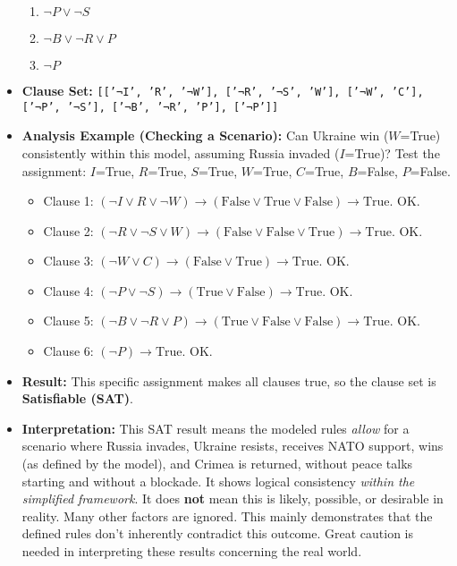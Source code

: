 \documentclass[11pt, a4paper]{article}
\begin{document}
\begin{itemize}
\begin{enumerate}
        \item $\neg P \vee \neg S$
        \item $\neg B \vee \neg R \vee P$
        \item $\neg P$
    \end{enumerate}
    \item \textbf{Clause Set:} \texttt{[['¬I', 'R', '¬W'], ['¬R', '¬S', 'W'], ['¬W', 'C'], ['¬P', '¬S'], ['¬B', '¬R', 'P'], ['¬P']]}
    \item \textbf{Analysis Example (Checking a Scenario):} Can Ukraine win ($W$=True) consistently within this model, assuming Russia invaded ($I$=True)? Test the assignment: $I$=True, $R$=True, $S$=True, $W$=True, $C$=True, $B$=False, $P$=False.
    \begin{itemize}
        \item Clause 1: $(\neg I \vee R \vee \neg W) \rightarrow (\text{False} \vee \text{True} \vee \text{False}) \rightarrow \text{True}$. OK.
        \item Clause 2: $(\neg R \vee \neg S \vee W) \rightarrow (\text{False} \vee \text{False} \vee \text{True}) \rightarrow \text{True}$. OK.
        \item Clause 3: $(\neg W \vee C) \rightarrow (\text{False} \vee \text{True}) \rightarrow \text{True}$. OK.
        \item Clause 4: $(\neg P \vee \neg S) \rightarrow (\text{True} \vee \text{False}) \rightarrow \text{True}$. OK.
        \item Clause 5: $(\neg B \vee \neg R \vee P) \rightarrow (\text{True} \vee \text{False} \vee \text{False}) \rightarrow \text{True}$. OK.
        \item Clause 6: $(\neg P) \rightarrow \text{True}$. OK.
    \end{itemize}
    \item \textbf{Result:} This specific assignment makes all clauses true, so the clause set is \textbf{Satisfiable (SAT)}.
    \item \textbf{Interpretation:} This SAT result means the modeled rules \textit{allow} for a scenario where Russia invades, Ukraine resists, receives NATO support, wins (as defined by the model), and Crimea is returned, without peace talks starting and without a blockade. It shows logical consistency \textit{within the simplified framework}. It does \textbf{not} mean this is likely, possible, or desirable in reality. Many other factors are ignored. This mainly demonstrates that the defined rules don't inherently contradict this outcome. Great caution is needed in interpreting these results concerning the real world.
\end{itemize}
\end{document}

